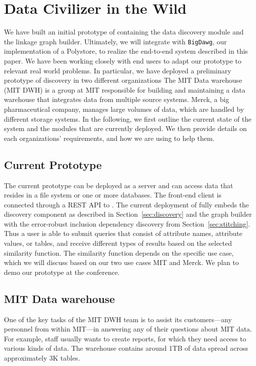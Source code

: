 \section{Data Civilizer in the Wild}
\label{sec:wild}

We have built an initial prototype of \dcv containing the data discovery module
and the linkage graph builder. Ultimately, we will integrate \dcv with
\texttt{BigDawg}, our implementation of a Polystore, to realize the end-to-end
system described in this paper.  We have been working closely with end users to
adapt our prototype to relevant real world problems.  In particular, we have deployed
a preliminary prototype of discovery in two different organizations The MIT Data
warehouse (MIT DWH) is a group at MIT responsible for building and maintaining a
data warehouse that integrates data from multiple source systems. Merck, a big
pharmaceutical company, manages large volumes of data, which are handled by
different storage systems.  In the following, we first outline the current state
of the system and the modules that are currently deployed.  We then provide
details on each organizations' requirements, and how we are using \dcv to help
them.

\subsection{Current \titledcv Prototype}
The current prototype can be deployed as a server and can access data that
resides in a file system or one or more databases.  The front-end client is
connected through a REST API to \dcv.  The current deployment of \dcv fully
embeds the discovery component as described in Section~\ref{sec:discovery} and
the graph builder with the error-robust inclusion dependency discovery from
Section~\ref{sec:stitching}.  Thus a user is able to submit queries that consist
of attribute names, attribute values, or tables, and receive different types of
results based on the selected similarity function. The similarity function
depends on the specific use case, which we will discuss based on our two use
cases MIT and Merck.  We plan to demo our \dcv prototype at the conference.

\subsection{MIT Data warehouse}

One of the key tasks of the MIT DWH team is to assist its customers—any
personnel from within MIT—in answering any of their questions about MIT data.
For example, staff usually wants to create reports, for which they need access
to various kinds of data. The warehouse contains around 1TB of data spread
across approximately 3K tables.

